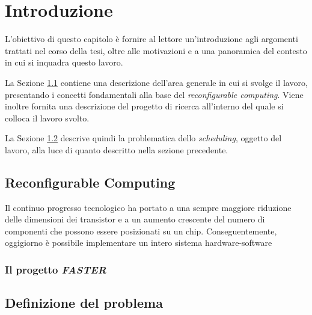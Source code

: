 \chapter{Introduzione}
\label{chap:intro}
\vspace{1cm}
L'obiettivo di questo capitolo è fornire al lettore un'introduzione agli argomenti 
trattati nel corso della tesi, oltre alle motivazioni e a una panoramica del contesto in 
cui si inquadra questo lavoro.

La Sezione \ref{sec:reconfComp} contiene una descrizione dell'area generale in cui si 
svolge il lavoro, presentando i concetti fondamentali alla base del \emph{reconfigurable 
computing}. Viene inoltre fornita una descrizione del progetto di ricerca all'interno del 
quale si colloca il lavoro svolto.

La Sezione \ref{sec:definizioneProblema} descrive quindi la problematica dello 
\emph{scheduling}, oggetto del lavoro, alla luce di quanto descritto nella sezione 
precedente.


\section{Reconfigurable Computing}
\label{sec:reconfComp}
Il continuo progresso tecnologico ha portato a una sempre maggiore riduzione delle 
dimensioni dei transistor e a un aumento crescente del numero di componenti che possono 
essere posizionati su un chip. Conseguentemente, oggigiorno è possibile implementare un 
intero sistema hardware-software 

\subsection{Il progetto \emph{FASTER}}
\label{sec:progettoFaster}


\section{Definizione del problema}
\label{sec:definizioneProblema}

